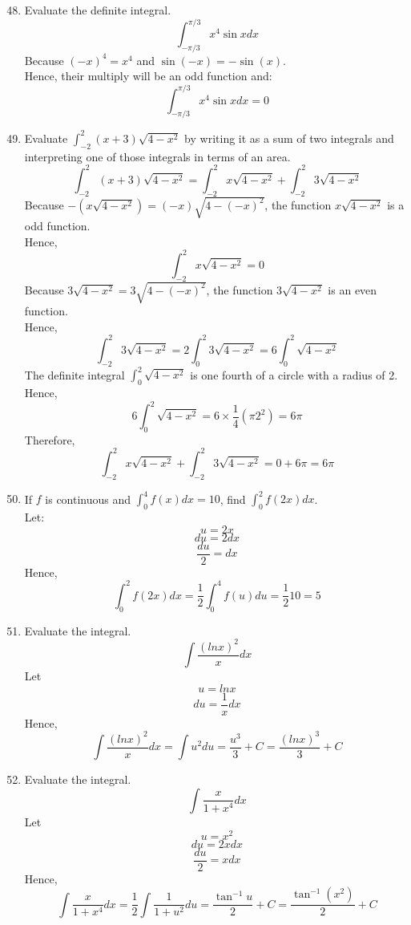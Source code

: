 \documentclass[12pt]{article}
\begin{document}
\begin{enumerate}
\setcounter{enumi}{47}
    \item Evaluate the definite integral.
    \[\int_{-\pi/3}^{\pi/3} x^4 \sin x dx\]
    Because $(-x)^4 = x^4$ and $\sin (-x) = - \sin (x)$.\\
    Hence, their multiply will be an odd function and:
    \[\int_{-\pi/3}^{\pi/3} x^4 \sin x dx = 0\]
\setcounter{enumi}{54}
    \item Evaluate $\int_{-2}^{2} (x+3)\sqrt{4-x^2}$ by writing it as a sum of two integrals and interpreting one of those integrals in terms of an area.
    \[\int_{-2}^{2} (x+3)\sqrt{4-x^2} = \int_{-2}^{2} x\sqrt{4-x^2} + \int_{-2}^{2} 3\sqrt{4-x^2}\]
    Because $- (x\sqrt{4-x^2}) = (-x)\sqrt{4-(-x)^2}$, the function $x\sqrt{4-x^2}$ is a odd function.\\
    Hence, 
    \[\int_{-2}^{2} x\sqrt{4-x^2} = 0\]
    Because $3\sqrt{4-x^2} = 3\sqrt{4-(-x)^2}$, the function $3\sqrt{4-x^2}$ is an even function.\\
    Hence, 
    \[\int_{-2}^{2} 3\sqrt{4-x^2} = 2\int_{0}^{2} 3\sqrt{4-x^2} = 6\int_{0}^{2} \sqrt{4-x^2}\]
    The definite integral $\int_{0}^{2} \sqrt{4-x^2}$ is one fourth of a circle with a radius of 2.\\
    Hence,
    \[6\int_{0}^{2} \sqrt{4-x^2} = 6 \times \frac{1}{4}(\pi 2^2) = 6\pi\]
    Therefore,
    \[\int_{-2}^{2} x\sqrt{4-x^2} + \int_{-2}^{2} 3\sqrt{4-x^2} = 0 + 6\pi = 6\pi\] 
\newpage
\setcounter{enumi}{58}
    \item If $f$ is continuous and $\int_{0}^{4} f(x)dx = 10$, find $\int_{0}^{2} f(2x) dx$.\\
    Let:
    \[u = 2x\]
    \[du = 2dx\]
    \[\frac{du}{2} = dx\]
    Hence,
    \[\int_{0}^{2} f(2x) dx = \frac{1}{2}\int_{0}^{4} f(u) du = \frac{1}{2}10 = 5\]
\setcounter{enumi}{68}
    \item Evaluate the integral.
    \[\int \frac{(ln x)^2}{x} dx\]
    Let
    \[u = ln x\]
    \[du = \frac{1}{x}dx\]
    Hence,
    \[\int \frac{(ln x)^2}{x} dx = \int u^2 du = \frac{u^3}{3} + C = \frac{(ln x)^3}{3} + C\]
\setcounter{enumi}{79}
    \item Evaluate the integral.
    \[\int \frac{x}{1+x^4}dx\]
    Let
    \[u = x^2\]
    \[du = 2xdx\]
    \[\frac{du}{2} = xdx\]
    Hence, 
    \[\int \frac{x}{1+x^4}dx = \frac{1}{2} \int \frac{1}{1 + u^2} du = \frac{\tan^{-1} u }{2} + C = \frac{\tan^{-1} (x^2) }{2} + C\]
\end{enumerate}
\end{document}
